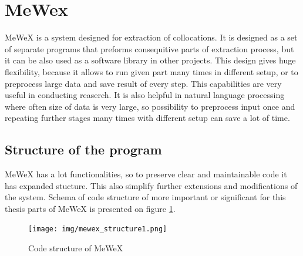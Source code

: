 \section{MeWex}
MeWeX is a system designed for extraction of collocations. It is designed as a set of separate programs 
that preforms consequitive parts of extraction process, but it can be also used as a software library in other projects. 
This design gives huge flexibility, because it allows to run given part many times in different setup, 
or to preprocess large data and save result of every step. This capabilities are very useful in conducting reaserch. 
It is also helpful in natural language processing where often size of data is very large, so possibility 
to preprocess input once and repeating further stages many times with different setup can save a lot of time.

\subsection{Structure of the program}
MeWeX has a lot functionalities, so to preserve clear and maintainable code it has expanded stucture. 
This also simplify further extensions and modifications of the system. Schema of code structure of more important 
or significant for this thesis parts of MeWeX is presented on figure \ref{img_structure}.

\begin{figure}[ht]
	\centering
	\texttt{[image: img/mewex\_structure1.png]}
	\caption{Code structure of MeWeX}
	\label{img_structure}
\end{figure}

